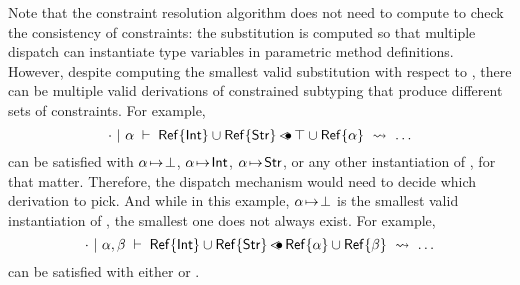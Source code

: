 Note that the constraint resolution algorithm does not need to compute
\substvars to check the consistency of constraints: the substitution 
is computed so that multiple dispatch can instantiate type variables
in parametric method definitions. However, despite \solvectrdflt
computing the smallest valid substitution with respect to \CSet, 
there can be multiple valid
derivations of constrained subtyping that produce different
sets of constraints.
For example,
\[
    \cdot~\vert~\alpha\;\vdash\;\mathsf{Ref}\{\mathsf{Int}\} \cup \mathsf{Ref}\{\mathsf{Str}\} \operatorname{\lessdot\!\!\bullet} \top \cup \mathsf{Ref}\{\alpha\}\ \rightsquigarrow\ \ldots
\]
can be satisfied with $\alpha\!\mapsto\!\bot$, $\alpha\!\mapsto\!\mathsf{Int}$,
$\alpha\!\mapsto\!\mathsf{Str}$, or any other instantiation of \va, for that matter.
Therefore, the dispatch mechanism would need to decide which derivation to pick.
And while in this example, $\alpha\!\mapsto\!\bot$ is the smallest valid
instantiation of \va, the smallest one does not always exist.
For example,
\[
    \cdot~\vert~\alpha,\beta\;\vdash\;\mathsf{Ref}\{\mathsf{Int}\} \cup \mathsf{Ref}\{\mathsf{Str}\} \operatorname{\lessdot\!\!\bullet} \mathsf{Ref}\{\alpha\} \cup \mathsf{Ref}\{\beta\}\ \rightsquigarrow\ \ldots
\]
can be satisfied with either
\subst{}{\substel{\va}{\tyint}, \substel{\vb}{\tystr\!}\!} or
\subst{}{\substel{\va}{\tystr}, \substel{\vb}{\tyint\!}\!}.

